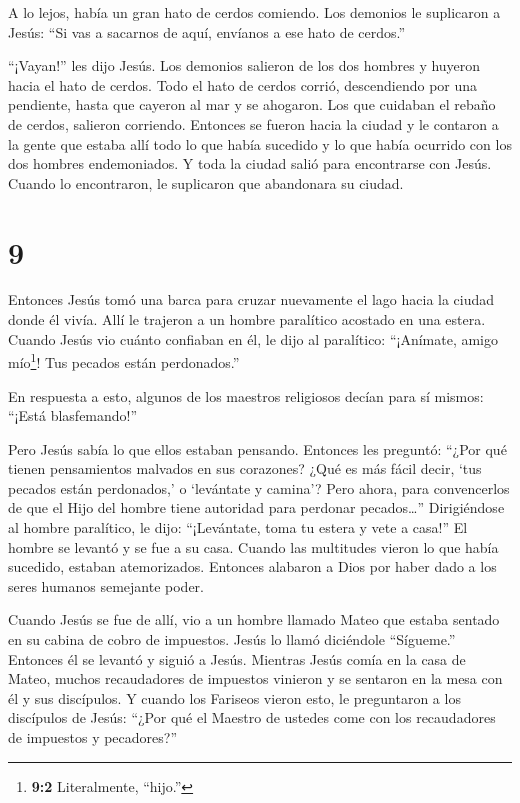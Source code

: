  A lo lejos, había un gran hato de cerdos comiendo.
 Los demonios le suplicaron a Jesús: ``Si vas a sacarnos de
aquí, envíanos a ese hato de cerdos.''

 ``¡Vayan!'' les dijo Jesús. Los demonios salieron de los
dos hombres y huyeron hacia el hato de cerdos. Todo el hato de cerdos
corrió, descendiendo por una pendiente, hasta que cayeron al mar y se
ahogaron.  Los que cuidaban el rebaño de cerdos, salieron
corriendo. Entonces se fueron hacia la ciudad y le contaron a la gente
que estaba allí todo lo que había sucedido y lo que había ocurrido con
los dos hombres endemoniados.  Y toda la ciudad salió para
encontrarse con Jesús. Cuando lo encontraron, le suplicaron que
abandonara su ciudad.

\hypertarget{section-8}{%
\section{9}\label{section-8}}

 Entonces Jesús tomó una barca para cruzar nuevamente el
lago hacia la ciudad donde él vivía.  Allí le trajeron a un
hombre paralítico acostado en una estera. Cuando Jesús vio cuánto
confiaban en él, le dijo al paralítico: ``¡Anímate, amigo
mío\footnote{\textbf{9:2} Literalmente, ``hijo.''}! Tus pecados están
perdonados.''

 En respuesta a esto, algunos de los maestros religiosos
decían para sí mismos: ``¡Está blasfemando!''

 Pero Jesús sabía lo que ellos estaban pensando. Entonces
les preguntó: ``¿Por qué tienen pensamientos malvados en sus corazones?
 ¿Qué es más fácil decir, `tus pecados están perdonados,' o
`levántate y camina'?  Pero ahora, para convencerlos de que
el Hijo del hombre tiene autoridad para perdonar pecados\ldots{}''
Dirigiéndose al hombre paralítico, le dijo: ``¡Levántate, toma tu estera
y vete a casa!''  El hombre se levantó y se fue a su casa.
 Cuando las multitudes vieron lo que había sucedido, estaban
atemorizados. Entonces alabaron a Dios por haber dado a los seres
humanos semejante poder.

 Cuando Jesús se fue de allí, vio a un hombre llamado Mateo
que estaba sentado en su cabina de cobro de impuestos. Jesús lo llamó
diciéndole ``Sígueme.'' Entonces él se levantó y siguió a Jesús.
 Mientras Jesús comía en la casa de Mateo, muchos
recaudadores de impuestos vinieron y se sentaron en la mesa con él y sus
discípulos.  Y cuando los Fariseos vieron esto, le
preguntaron a los discípulos de Jesús: ``¿Por qué el Maestro de ustedes
come con los recaudadores de impuestos y pecadores?''

